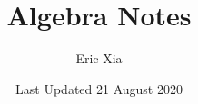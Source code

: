 \documentclass{article}
\title{Algebra Notes}
\author{Eric Xia}
\date{Last Updated 21 August 2020}
\begin{document}
    \maketitle
    \tableofcontents
    \pagebreak

\end{document}
